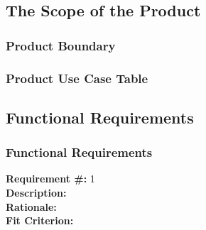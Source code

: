 \documentclass[12pt, titlepage]{article}
\begin{document}
\subsection{The Scope of the Product}
\subsubsection{Product Boundary}
\subsubsection{Product Use Case Table}
\subsection{Functional Requirements}
\subsubsection{Functional Requirements}
\textbf{Requirement \#:} 1 
       \\
      \textbf{Description:} \\
      \textbf{Rationale:} \\
      \textbf{Fit Criterion:} \\
\end{document}
